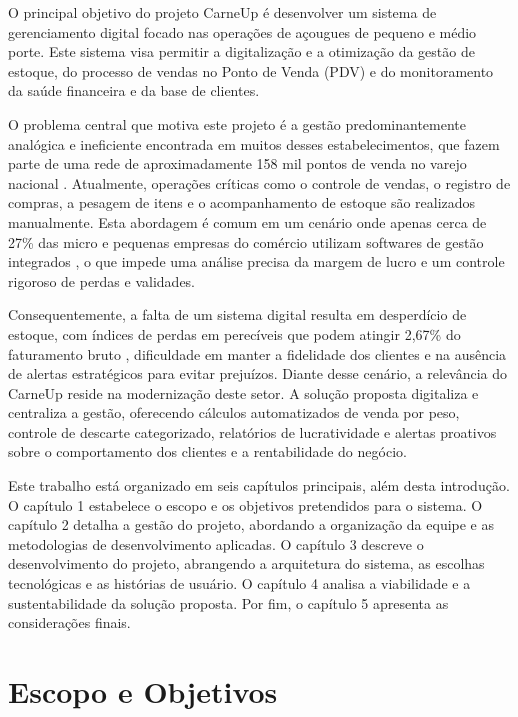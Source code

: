 \documentclass[
	12pt,				%
	openany,			%
	oneside,			%
	a4paper,			%
	english,			%
	french,				%
	spanish,			%
	brazil				%
	]{abntex2}
\begin{document}
O principal objetivo do projeto CarneUp é desenvolver um sistema de gerenciamento digital focado nas operações de açougues de pequeno e médio porte. Este sistema visa permitir a digitalização e a otimização da gestão de estoque, do processo de vendas no Ponto de Venda (PDV) e do monitoramento da saúde financeira e da base de clientes.

O problema central que motiva este projeto é a gestão predominantemente analógica e ineficiente encontrada em muitos desses estabelecimentos, que fazem parte de uma rede de aproximadamente 158 mil pontos de venda no varejo nacional \cite{abiec2025}. Atualmente, operações críticas como o controle de vendas, o registro de compras, a pesagem de itens e o acompanhamento de estoque são realizados manualmente. Esta abordagem é comum em um cenário onde apenas cerca de 27\% das micro e pequenas empresas do comércio utilizam softwares de gestão integrados \cite{sebrae2024}, o que impede uma análise precisa da margem de lucro e um controle rigoroso de perdas e validades.

Consequentemente, a falta de um sistema digital resulta em desperdício de estoque, com índices de perdas em perecíveis que podem atingir 2,67\% do faturamento bruto \cite{abras2024}, dificuldade em manter a fidelidade dos clientes e na ausência de alertas estratégicos para evitar prejuízos. Diante desse cenário, a relevância do CarneUp reside na modernização deste setor. A solução proposta digitaliza e centraliza a gestão, oferecendo cálculos automatizados de venda por peso, controle de descarte categorizado, relatórios de lucratividade e alertas proativos sobre o comportamento dos clientes e a rentabilidade do negócio.

Este trabalho está organizado em seis capítulos principais, além desta introdução. O capítulo 1 estabelece o escopo e os objetivos pretendidos para o sistema. O capítulo 2 detalha a gestão do projeto, abordando a organização da equipe e as metodologias de desenvolvimento aplicadas. O capítulo 3 descreve o desenvolvimento do projeto, abrangendo a arquitetura do sistema, as escolhas tecnológicas e as histórias de usuário. O capítulo 4 analisa a viabilidade e a sustentabilidade da solução proposta. Por fim, o capítulo 5 apresenta as considerações finais.


\chapter{Escopo e Objetivos}
\label{cap:escopo}
\end{document}
